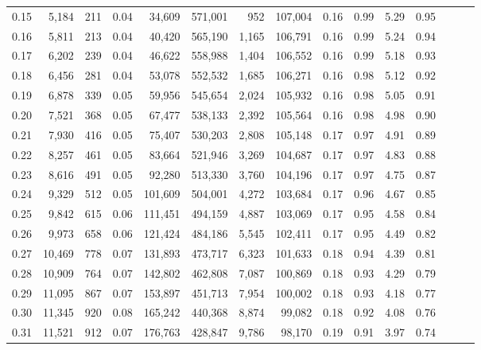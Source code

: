 \begin{tabular}{rrrrrrrrrrrrrrr}
0.15 &   5,184 &    211 &  0.04 &   34,609 &  571,001 &      952 &  107,004 &  0.16 &  0.99 &  5.29 &      0.95 \\
0.16 &   5,811 &    213 &  0.04 &   40,420 &  565,190 &    1,165 &  106,791 &  0.16 &  0.99 &  5.24 &      0.94 \\
0.17 &   6,202 &    239 &  0.04 &   46,622 &  558,988 &    1,404 &  106,552 &  0.16 &  0.99 &  5.18 &      0.93 \\
0.18 &   6,456 &    281 &  0.04 &   53,078 &  552,532 &    1,685 &  106,271 &  0.16 &  0.98 &  5.12 &      0.92 \\
0.19 &   6,878 &    339 &  0.05 &   59,956 &  545,654 &    2,024 &  105,932 &  0.16 &  0.98 &  5.05 &      0.91 \\
0.20 &   7,521 &    368 &  0.05 &   67,477 &  538,133 &    2,392 &  105,564 &  0.16 &  0.98 &  4.98 &      0.90 \\
0.21 &   7,930 &    416 &  0.05 &   75,407 &  530,203 &    2,808 &  105,148 &  0.17 &  0.97 &  4.91 &      0.89 \\
0.22 &   8,257 &    461 &  0.05 &   83,664 &  521,946 &    3,269 &  104,687 &  0.17 &  0.97 &  4.83 &      0.88 \\
0.23 &   8,616 &    491 &  0.05 &   92,280 &  513,330 &    3,760 &  104,196 &  0.17 &  0.97 &  4.75 &      0.87 \\
0.24 &   9,329 &    512 &  0.05 &  101,609 &  504,001 &    4,272 &  103,684 &  0.17 &  0.96 &  4.67 &      0.85 \\
0.25 &   9,842 &    615 &  0.06 &  111,451 &  494,159 &    4,887 &  103,069 &  0.17 &  0.95 &  4.58 &      0.84 \\
0.26 &   9,973 &    658 &  0.06 &  121,424 &  484,186 &    5,545 &  102,411 &  0.17 &  0.95 &  4.49 &      0.82 \\
0.27 &  10,469 &    778 &  0.07 &  131,893 &  473,717 &    6,323 &  101,633 &  0.18 &  0.94 &  4.39 &      0.81 \\
0.28 &  10,909 &    764 &  0.07 &  142,802 &  462,808 &    7,087 &  100,869 &  0.18 &  0.93 &  4.29 &      0.79 \\
0.29 &  11,095 &    867 &  0.07 &  153,897 &  451,713 &    7,954 &  100,002 &  0.18 &  0.93 &  4.18 &      0.77 \\
0.30 &  11,345 &    920 &  0.08 &  165,242 &  440,368 &    8,874 &   99,082 &  0.18 &  0.92 &  4.08 &      0.76 \\
0.31 &  11,521 &    912 &  0.07 &  176,763 &  428,847 &    9,786 &   98,170 &  0.19 &  0.91 &  3.97 &      0.74 \\

\end{tabular}
